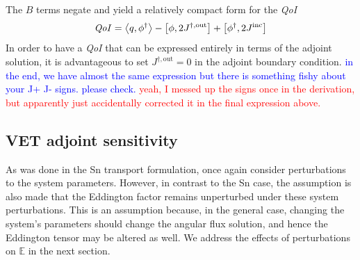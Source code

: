 \documentclass[12pt]{report}
\newcommand{\bra}{\left\langle}
\newcommand{\ket}{\right\rangle}
\newcommand{\sbra}{\left[}
\newcommand{\sket}{\right]}
\newcommand{\Edd}{\mathbb{E}}
\newcommand{\scalSource}{q}
\newcommand{\qoi}{{\it QoI}\xspace}
\newcommand{\comment}[2]{\marginpar{\textcolor{#2}{$\star$}}\textcolor{#2}{#1}\newline}
\newcommand{\iwh}[1]{\comment{#1}{red}}
\newcommand{\jcr}[1]{\comment{#1}{blue}}
\newcommand{\iwh}[1]{\phantom{a}}
\newcommand{\jcr}[1]{\phantom{a}}
\begin{document}
The $B$ terms negate and yield a relatively compact form for the \qoi
\begin{equation}
\label{VETQoIAdj}
\qoi=\bra \scalSource , \phi^\dag \ket 
- \sbra \phi, 2J^{\dag,\text{out}} \sket  + \sbra \phi^\dag, 2J^{\text{inc}} \sket
\end{equation}
In order to have a \qoi that can be expressed entirely in terms of the adjoint solution, it is advantageous to 
set $J^{\dag,\text{out}}=0$ in the adjoint boundary condition.
\jcr{in the end, we have almost the same expression but there is something fishy about your J+ J- signs. please check.}
\iwh{yeah, I messed up the signs once in the derivation, but apparently just accidentally corrected it in the final expression above.}


\subsection{VET adjoint sensitivity}

As was done in the Sn transport formulation, once again consider perturbations to the system parameters. However, in contrast to the Sn case, the assumption is also made that the Eddington factor remains unperturbed under these system perturbations. This is an assumption because, in the general case, changing the system's parameters should change the angular flux solution, and hence
the Eddington tensor may be altered as well. We address the effects of perturbations on $\Edd$ in the next section.
\end{document}
